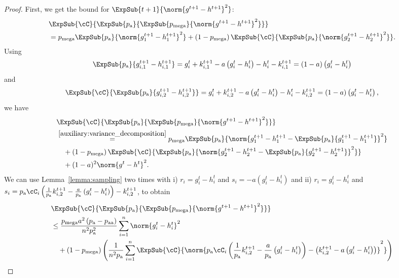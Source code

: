 \documentclass{article}
\newcommand*{\probavailable}{\ensuremath{p_{\textnormal{a}}}}
\newcommand*{\probpairaa}{\ensuremath{p_{\textnormal{aa}}}}
\newcommand*{\probmega}{\ensuremath{p_{\text{mega}}}}
\begin{document}
\begin{proof}
  First, we get the bound for $\ExpSub{t+1}{\norm{g^{t+1} - h^{t+1}}^2}$:
  \begin{align*}
    &\ExpSub{\cC}{\ExpSub{\probavailable}{\ExpSub{\probmega}{\norm{g^{t+1} - h^{t+1}}^2}}} \\
    &= \probmega \ExpSub{\probavailable}{\norm{g^{t+1}_1 - h^{t+1}_1}^2} + \left(1 - \probmega\right) \ExpSub{\cC}{\ExpSub{\probavailable}{\norm{g^{t+1}_2 - h^{t+1}_2}^2}}.
  \end{align*}
  Using
  \begin{align*}
    \ExpSub{\probavailable}{g^{t+1}_{i,1} - h^{t+1}_{i,1}} = g^{t}_i + k^{t+1}_{i, 1} - a\left(g^t_i - h^t_i\right) - h^t_i - k^{t+1}_{i, 1} = \left(1 - a\right) \left(g^t_i - h^t_i\right)
  \end{align*}
  and 
  \begin{align*}
    \ExpSub{\cC}{\ExpSub{\probavailable}{g^{t+1}_{i,2} - h^{t+1}_{i,2}}} = g^t_i + k^{t+1}_{i, 2} - a \left(g^t_i - h^{t}_i\right) - h^t_i - k^{t+1}_{i, 2} = (1 - a) \left(g^t_i - h^{t}_i\right),
  \end{align*}
  we have
  \begin{align*}
    &\ExpSub{\cC}{\ExpSub{\probavailable}{\ExpSub{\probmega}{\norm{g^{t+1} - h^{t+1}}^2}}} \\
    &\overset{\eqref{auxiliary:variance_decomposition}}{=} \probmega \ExpSub{\probavailable}{\norm{g^{t+1}_1 - h^{t+1}_1 - \ExpSub{\probavailable}{g^{t+1}_1 - h^{t+1}_1}}^2} \\
    &\quad + \left(1 - \probmega\right) \ExpSub{\cC}{\ExpSub{\probavailable}{\norm{g^{t+1}_2 - h^{t+1}_2 - \ExpSub{\probavailable}{g^{t+1}_2 - h^{t+1}_2}}^2}} \\
    &\quad + (1 - a)^2 \norm{g^{t} - h^{t}}^2.
  \end{align*}
  We can use Lemma~\ref{lemma:sampling} two times with i) $r_i = g^{t}_i - h^{t}_i$ and $s_i = -a\left(g^{t}_i - h^{t}_i\right)$ and ii) $r_i = g^{t}_i - h^{t}_i$ and $s_i = \probavailable\cC_i\left(\frac{1}{\probavailable}k^{t+1}_{i, 2} - \frac{a}{\probavailable} \left(g^t_i - h^{t}_i\right)\right) - k^{t+1}_{i, 2}$, to obtain
  \begin{align*}
    &\ExpSub{\cC}{\ExpSub{\probavailable}{\ExpSub{\probmega}{\norm{g^{t+1} - h^{t+1}}^2}}} \\
    &\leq \frac{\probmega a^2 \left(\probavailable - \probpairaa\right)}{n^2 \probavailable^2}\sum_{i=1}^n\norm{g^{t}_i - h^{t}_i}^2 \\
    &\quad + \left(1 - \probmega\right) \left(\frac{1}{n^2 \probavailable}\sum_{i=1}^n\ExpSub{\cC}{\norm{\probavailable\cC_i\left(\frac{1}{\probavailable}k^{t+1}_{i, 2} - \frac{a}{\probavailable} \left(g^t_i - h^{t}_i\right)\right) - \left(k^{t+1}_{i, 2} - a\left(g^t_i - h^{t}_i\right)\right)}^2}\right)\\

\end{align*}
\end{proof}
\end{document}
